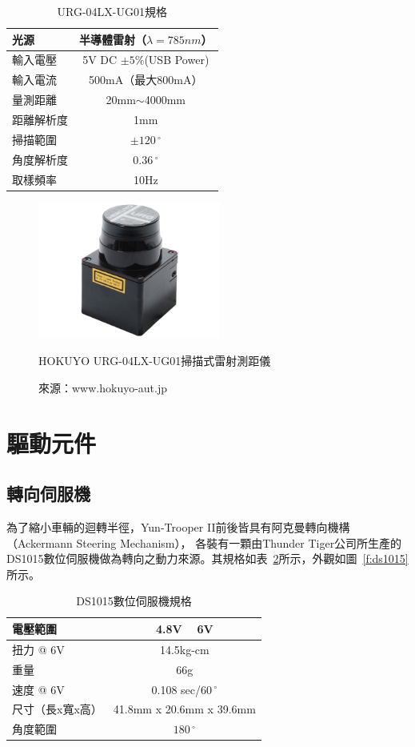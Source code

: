 \begin{table}[h!]
	\centering
	\caption{URG-04LX-UG01規格}
	\label{t:urg-specs}
	\begin{tabular}{| l | c |}
		\hline
		光源 & 半導體雷射（$\lambda = 785nm$） \\ \hline
		輸入電壓 & 5V DC $\pm 5\%$(USB Power) \\ \hline
		輸入電流 & 500mA（最大800mA） \\ \hline
		量測距離 & 20mm$\sim$4000mm \\ \hline
		距離解析度 & 1mm \\ \hline
		掃描範圍 & $\pm 120\,^{\circ}$ \\ \hline
		角度解析度 & $0.36\,^{\circ}$ \\ \hline
		取樣頻率 & 10Hz \\
		\hline
	\end{tabular}
\end{table}

\begin{figure}[h!]
	\centering
	\includegraphics[width=6cm]{figures/hardware/URG-04LX-UG01}
	\caption{HOKUYO URG-04LX-UG01掃描式雷射測距儀}
	\caption*{來源：www.hokuyo-aut.jp}
	\label{f:urg}
\end{figure}

\section{驅動元件}

\subsection{轉向伺服機}
為了縮小車輛的迴轉半徑，Yun-Trooper II前後皆具有阿克曼轉向機構（Ackermann Steering Mechanism），
各裝有一顆由Thunder Tiger公司所生產的DS1015數位伺服機做為轉向之動力來源。其規格如表~\ref{t:ds1015-specs}所示，外觀如圖~\ref{f:ds1015}所示。

\begin{table}[h!]
	\centering
	\caption{DS1015數位伺服機規格}
	\label{t:ds1015-specs}
	\begin{tabular}{ | l | c |}
		\hline
		電壓範圍 & 4.8V ~ 6V \\ \hline
		扭力 @ 6V & 14.5kg-cm \\ \hline
		重量 & 66g \\ \hline
		速度 @ 6V & 0.108 sec/$60\,^{\circ}$ \\ \hline
		尺寸（長x寬x高） & 41.8mm x 20.6mm x 39.6mm \\ \hline
		角度範圍 & $180\,^{\circ}$ \\
		\hline
	\end{tabular}
\end{table}

